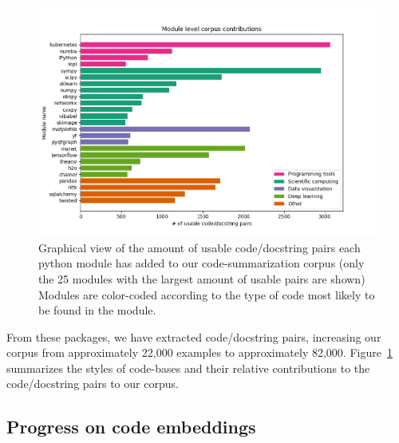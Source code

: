 \documentclass[article, 12pt, oneside]{memoir}
\begin{document}
\begin{figure}[h]
\centering
\includegraphics{figs/module_corpus_contributions.png}
\caption{Graphical view of the amount of usable code/docstring pairs
each python module has added to our code-summarization corpus (only the
25 modules with the largest amount of usable pairs are shown) Modules
are color-coded according to the type of code most likely to be found in
the module.\label{fig:sum_corpus}}
\end{figure}

From these packages, we have extracted code/docstring pairs, increasing
our corpus from approximately 22,000 examples to approximately 82,000.
Figure~\ref{fig:sum_corpus} summarizes the styles of code-bases and their
relative contributions to the code/docstring pairs to our corpus.




\hypertarget{progress-on-code-embeddings}{%
\subsection{Progress on code
embeddings}\label{progress-on-code-embeddings}}
\end{document}
